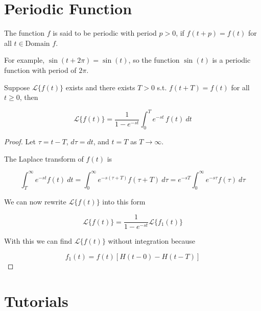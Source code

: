 \section{Periodic Function}

\begin{definition}
    The function $f$ is said to be periodic with period $p > 0$, if $f(t + p) = f(t)$ 
    for all $t \in \text{Domain } f$.
\end{definition}

For example, $\sin(t + 2\pi) = \sin(t)$, so the function $\sin(t)$ is a periodic function 
with period of $2\pi$.

\begin{theorem}
    Suppose $\mathcal{L}\{f(t)\}$ exists and there exists $T > 0$ s.t. $f(t + T) = f(t)$ for all 
    $t \geq 0$, then 

    \begin{equation}
        \mathcal{L}\{f(t)\} = \frac{1}{1 - e^{-st}} \int_{0}^{T} e^{-st}\, f(t)\> dt
    \end{equation}
\end{theorem}
\begin{proof}
    Let $\tau = t - T$, $d\tau = dt$, and $t = T$ as $T \to \infty$. 

    The Laplace transform of $f(t)$ is 

    \begin{equation*}
        \int^\infty_T e^{-st}f(t)\> dt = \int^\infty_0 e^{-s(\tau + T)} f(\tau + T) \> d\tau = e^{-sT} \int^\infty_0 e^{-s\tau} f(\tau) \> d\tau
    \end{equation*}

    We can now rewrite $\mathcal{L}\{ f(t) \}$ into this form

    \begin{equation*}
        \mathcal{L}\{f(t)\} = \frac{1}{1 - e^{-st}} \mathcal{L} \{ f_1(t) \}
    \end{equation*}

    With this we can find $\mathcal{L}\{ f(t) \}$ without integration because 
    
    \[
        f_1(t) = f(t)[H(t - 0) - H(t - T)]
    \]
\end{proof}

\section{Tutorials}


